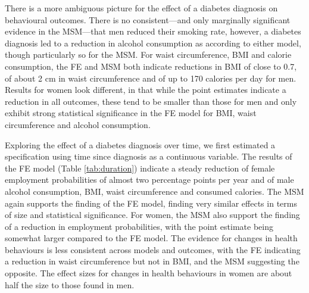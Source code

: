 There is a more ambiguous picture for the effect of a diabetes diagnosis on behavioural outcomes. There is no consistent---and only marginally significant evidence in the \ac{MSM}---that men reduced their smoking rate, however, a diabetes diagnosis led to a reduction in alcohol consumption as according to either model, though particularly so for the \ac{MSM}. For waist circumference, \ac{BMI} and calorie consumption, the \ac{FE} and \ac{MSM} both indicate reductions in \ac{BMI} of close to 0.7, of about 2 cm in waist circumference and of up to 170 calories per day for men. Results for women look different, in that while the point estimates indicate a reduction in all outcomes, these tend to be smaller than those for men and only exhibit strong statistical significance in the \ac{FE} model for \ac{BMI}, waist circumference and alcohol consumption.

Exploring the effect of a diabetes diagnosis over time, we first estimated a specification using time since diagnosis as a continuous variable. The results of the \ac{FE} model (Table \ref{tab:duration}) indicate a steady reduction of female employment probabilities of almost two percentage points per year and of male alcohol consumption, \ac{BMI}, waist circumference and consumed calories. The \ac{MSM} again supports the finding of the \ac{FE} model, finding very similar effects in terms of size and statistical significance. For women, the \ac{MSM} also support the finding of a reduction in employment probabilities, with the point estimate  being somewhat larger compared to the \ac{FE} model. The evidence for changes in health behaviours is less consistent across models and outcomes, with the \ac{FE} indicating a reduction in waist circumference but not in \ac{BMI}, and the \ac{MSM} suggesting the opposite. The effect sizes for changes in health behaviours in women are about half the size to those found in men. 

